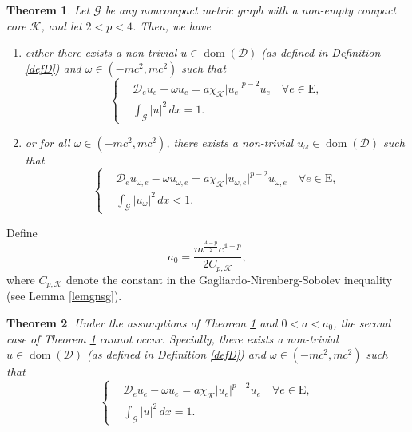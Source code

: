\documentclass[11pt]{amsart}
\newtheorem{theorem}{Theorem}[section]
\newtheorem{remark}[theorem]{Remark}
\newcommand{\abs}[1]{\lvert#1\rvert}
\newcommand{\red}[1]{\textcolor{red}{#1}}
\newcommand{\D}{\mathcal{D}}
\newcommand{\G}{\mathcal{G}}
\newcommand{\K}{\mathcal{K}}
\numberwithin{equation}{section}
\begin{document}

\begin{theorem}
\label{th1}
    Let $\G$ be any noncompact metric graph with a non-empty compact core $\K$, and let $2< p < 4$. Then, we have\\
    \begin{enumerate}[label=\rm(\roman*)]
        \item either there exists a non-trivial $u \in \operatorname{dom}(\D)$ (as defined in Definition \ref{defD}) and $\omega \in (-mc^2, mc^2)$ such that
    \begin{equation*}
    \left\{\begin{aligned}
        &\D_e u_e - \omega u_e= a\chi_\K\abs{u_e}^{p-2}u_e \quad \forall e\in \mathrm{E},\\
        &\int_\G\abs{u}^2\,dx = 1.
    \end{aligned}
    \right.
\end{equation*}
\item  or for all $\omega \in (-mc^2, mc^2)$, there exists a non-trivial $u_\omega \in \operatorname{dom}(\D)$ such that
    \begin{equation*}
    \left\{\begin{aligned}
        &\D_e u_{\omega,e} - \omega u_{\omega,e} = a\chi_\K\abs{u_{\omega,e}}^{p-2}u_{\omega,e} \quad\forall e\in \mathrm{E},\\
        &\int_\G\abs{u_\omega}^2\,dx < 1.
    \end{aligned}
    \right.
    \end{equation*}
    \end{enumerate}
\end{theorem}
Define
\begin{equation}
    \label{eqa0}
a_0 = \frac{m^\frac{4-p}{2}c^{4-p}}{2C_{p,\K}},
\end{equation}
where $C_{p,\K}$ denote the constant in the Gagliardo-Nirenberg-Sobolev inequality (see Lemma \ref{lemgnsg}).
\begin{theorem}\label{th2}
    Under the assumptions of Theorem \ref{th1} and $0<a<a_0$,  the second
case of Theorem \ref{th1} cannot occur.
Specially, there exists a non-trivial $u \in \operatorname{dom}(\D)$ (as defined in Definition \ref{defD}) and $\omega \in (-mc^2, mc^2)$ such that
    \begin{equation*}
    \left\{\begin{aligned}
        &\D_e u_e - \omega u_e= a\chi_\K\abs{u_e}^{p-2}u_e \quad \forall e\in \mathrm{E},\\
        &\int_\G\abs{u}^2\,dx = 1.
    \end{aligned}
    \right.
\end{equation*}
\end{theorem}
\end{document}
